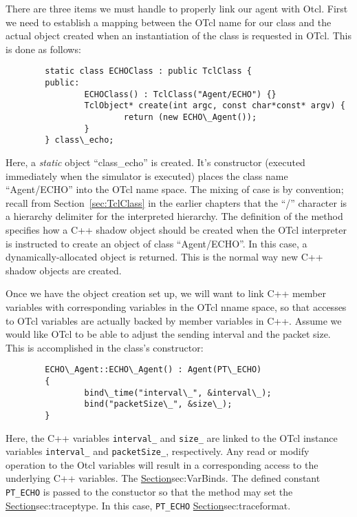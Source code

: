 There are three items we must handle to properly link our agent
with Otcl.
First we need to establish a mapping between the OTcl name
for our class and the actual object created when an
instantiation of the class is requested in OTcl.
This is done as follows:
\begin{verbatim}
        static class ECHOClass : public TclClass {
        public:
                ECHOClass() : TclClass("Agent/ECHO") {}
                TclObject* create(int argc, const char*const* argv) {
                        return (new ECHO\_Agent());
                }
        } class\_echo;
\end{verbatim}
Here, a {\em static} object ``class\_echo'' is created. It's constructor
(executed immediately when the simulator is executed) places the class name
``Agent/ECHO'' into the OTcl name space.
The mixing of case is by convention;
recall from Section~\ref{sec:TclClass} in the earlier chapters that
the ``/'' character is a hierarchy delimiter for the interpreted hierarchy.
The definition of the  method specifies how a C++
shadow object should be created when
the OTcl interpreter is instructed to create an
object of class ``Agent/ECHO''.  In this case, a dynamically-allocated
object is returned.  This is the normal way new C++ shadow objects
are created.

Once we have the object creation set up, we will want to link
C++ member variables with corresponding variables in the OTcl
nname space, so that accesses to OTcl variables are actually
backed by member variables in C++.
Assume we would like OTcl to be able to adjust the sending
interval and the packet size.
This is accomplished in the class's constructor:
\begin{verbatim}
        ECHO\_Agent::ECHO\_Agent() : Agent(PT\_ECHO)
        {
                bind\_time("interval\_", &interval\_);
                bind("packetSize\_", &size\_);
        }
\end{verbatim}
Here, the C++ variables {\tt interval\_} and {\tt size\_} are
linked to the OTcl instance variables {\tt interval\_} and
{\tt packetSize\_}, respectively.
Any read or modify operation to the Otcl variables will result
in a corresponding access to the underlying C++ variables.
The \href{details of the \fcn[]{bind} methods are described elsewhere}{%
        Section}{sec:VarBinds}.
The defined constant {\tt PT\_ECHO} is passed to the 
constuctor so that the  method may set
the \href{packet type field used by the trace support}{%
        Section}{sec:traceptype}.
In this case, {\tt PT\_ECHO} 
\href{represents a new packet type and must be defined in \textasciitilde\emph{ns}/{trace.h}}{%
        Section}{sec:traceformat}.

